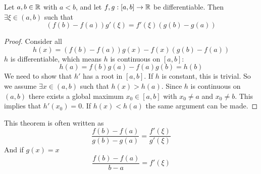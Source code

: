 \documentclass[../../script.tex]{subfiles}
\begin{document}
\begin{thm}
    Let $a, b \in \mathbb{R}$ with $a < b$, and let $f, g: [a, b] \rightarrow \mathbb{R}$ be differentiable. Then $\exists \xi \in (a, b)$ such that 
    \[
        (f(b) - f(a))g'(\xi) = f'(\xi)(g(b) - g(a))
    \]

    \begin{center}
    \end{center}
\end{thm}
\begin{proof}
    Consider all
    \begin{equation}
        h(x) = (f(b) - f(a))g(x) - f(x)(g(b) - f(a))
    \end{equation}
    $h$ is differentiable, which means $h$ is continuous on $[a, b]$:
    \begin{equation}
        h(a) = f(b)g(a) - f(a)g(b) = h(b)
    \end{equation}
    We need to show that $h'$ has a root in $[a, b]$. If $h$ is constant, this is trivial. So we assume $\exists x \in (a, b)$ such that $h(x) > h(a)$.
    Since $h$ is continuous on $(a, b)$ there exists a global maximum $x_0 \in [a, b]$ with $x_0 \ne a$ and $x_0 \ne b$. 
    This implies that $h'(x_0) = 0$. If $h(x) < h(a)$ the same argument can be made.
\end{proof}

\begin{rem}
    This theorem is often written as
    \[
        \frac{f(b) - f(a)}{g(b) - g(a)} = \frac{f'(\xi)}{g'(\xi)}
    \]
    And if $g(x) = x$
    \[
        \frac{f(b) - f(a)}{b - a} = f'(\xi)
    \]
\end{rem}
\end{document}

